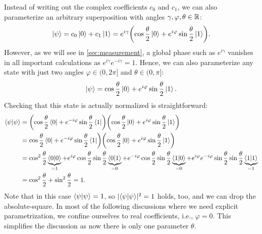 		Instead of writing out the complex coefficients \(c_0\) and \(c_1\), we can also parameterize an arbitrary superposition with angles \( \gamma, \varphi, \theta \in \mathbb{R} \):
		\begin{equation}
			\ket{\psi}
			= c_0 \ket{0} + c_1 \ket{1}
			= e^{i \gamma} \biggl( \cos\frac{\theta}{2} \ket{0} + e^{i \varphi} \sin\frac{\theta}{2} \ket{1} \biggr).
		\end{equation}
		However, as we will see in \autoref{sec:measurement}, a global phase such as \(e^{i \gamma}\) vanishes in all important calculations as \( e^{i \gamma} e^{-i \gamma} = 1 \). Hence, we can also parameterize any state with just two angles \( \varphi \in (0, 2\pi] \) and \( \theta \in (0, \pi] \):
		\begin{equation}
			\ket{\psi} = \cos\frac{\theta}{2} \ket{0} + e^{i \varphi} \sin\frac{\theta}{2} \ket{1}.
		\end{equation}
		Checking that this state is actually normalized is straightforward:
		\begin{align}
			\braket{\psi}{\psi}
			 & = \biggl( \cos\frac{\theta}{2} \bra{0} + e^{-i \varphi} \sin\frac{\theta}{2} \bra{1} \biggr) \biggl( \cos\frac{\theta}{2} \ket{0} + e^{i \varphi} \sin\frac{\theta}{2} \ket{1} \biggr) \\
			 & = \cos\frac{\theta}{2} \bra{0} + e^{-i \varphi} \sin\frac{\theta}{2} \bra{1} \biggr) \biggl( \cos\frac{\theta}{2} \ket{0} + e^{i \varphi} \sin\frac{\theta}{2} \ket{1} \biggr)         \\
			 & = \cos^2\frac{\theta}{2} \underbrace{\braket{0}{0}}_{= 1}
			+ e^{i \varphi} \cos\frac{\theta}{2} \sin\frac{\theta}{2} \underbrace{\braket{0}{1}}_{= 0}
			+ e^{-i \varphi} \cos\frac{\theta}{2} \sin\frac{\theta}{2} \underbrace{\braket{1}{0}}_{= 0}
			+ e^{i \varphi} e^{-i \varphi} \sin\frac{\theta}{2} \sin\frac{\theta}{2} \underbrace{\braket{1}{1}}_{= 1}                                                                                 \\
			 & = \cos^2\frac{\theta}{2} + \sin^2\frac{\theta}{2}
			= 1.
		\end{align}
		Note that in this case \( \braket{\psi}{\psi} = 1 \), so \( \lvert \braket{\psi}{\psi} \rvert^2 = 1 \) holds, too, and we can drop the absolute-square. In most of the following discussions where we need explicit parametrization, we confine ourselves to real coefficients, i.e., \(\varphi = 0\). This simplifies the discussion as now there is only one parameter \(\theta\).


